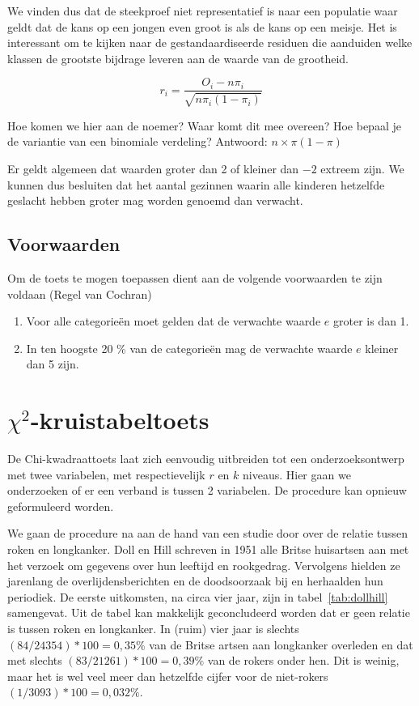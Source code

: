 We vinden dus dat de steekproef niet representatief is naar een populatie waar geldt dat de kans op een jongen even groot is als de kans op een meisje. Het is interessant om te kijken naar de gestandaardiseerde residuen die aanduiden welke klassen de grootste bijdrage leveren aan de waarde van de grootheid. 

\[ r_{i} = \frac{O_{i} - n \pi_{i}}{\sqrt{n \pi_{i}(1-\pi_{i})}} \]

\begin{exercise}
	Hoe komen we hier aan de noemer? Waar komt dit mee overeen? Hoe bepaal je de variantie van een binomiale verdeling?
Antwoord: $n \times \pi (1-\pi)$
\end{exercise}



Er geldt algemeen dat waarden groter dan 2 of kleiner dan $-2$ extreem zijn. We kunnen dus besluiten dat het aantal gezinnen waarin alle kinderen hetzelfde geslacht hebben groter mag worden genoemd dan verwacht.

\subsection{Voorwaarden}
 Om de toets te mogen toepassen dient aan de volgende voorwaarden te zijn voldaan (Regel van Cochran)
\begin{enumerate}
	\item Voor alle categorie\"en moet gelden dat de verwachte waarde $e$ groter is dan 1.
	\item In ten hoogste 20 \% van de categorie\"en mag de verwachte waarde $e$ kleiner dan 5 zijn.
\end{enumerate}


\section{\texorpdfstring{$\chi^{2}$}{Chi-kwadraat}-kruistabeltoets}
De Chi-kwadraattoets  laat zich eenvoudig uitbreiden tot een onderzoeksontwerp
met twee variabelen, met respectievelijk $r$ en $k$ niveaus. Hier gaan we onderzoeken of er een verband is tussen 2 variabelen. De procedure kan opnieuw geformuleerd worden.

We gaan de procedure na aan de hand van een studie door \textcite{Doll1954} over de relatie tussen roken en longkanker. Doll en Hill schreven in 1951 alle Britse huisartsen aan met het verzoek om gegevens over hun leeftijd en rookgedrag. Vervolgens hielden ze jarenlang de overlijdensberichten en de doodsoorzaak bij en herhaalden hun periodiek. De eerste uitkomsten, na circa vier jaar, zijn in tabel~\ref{tab:dollhill} samengevat. Uit de tabel kan makkelijk geconcludeerd worden dat er geen relatie is tussen roken en longkanker. In (ruim) vier jaar is slechts $(84 / 24354) * 100 = 0,35\% $ van de Britse artsen aan longkanker overleden en dat met slechts $(83 / 21261) * 100 = 0,39\%$ van de rokers onder hen. Dit is weinig, maar het is wel veel meer dan hetzelfde cijfer voor de niet-rokers $(1 / 3093) * 100 = 0,032\%$.


